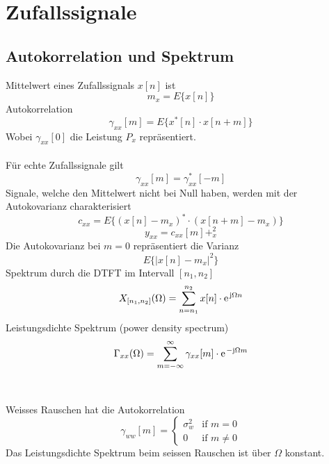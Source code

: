 



\chapter{Zufallssignale}
\section{Autokorrelation und Spektrum}
Mittelwert eines Zufallssignals $x[n]$ ist
\[ m_x = E\{x[n]\} \]
Autokorrelation
\[ \gamma_{xx}[m] = E\{x^*[n] \cdot x[n+m]\} \]
Wobei $\gamma_{xx}[0]$ die Leistung $P_x$ repräsentiert.\\\\
Für echte Zufallssignale gilt
\[ \gamma_{xx}[m] = \gamma_{xx}^*[-m] \]
Signale, welche den Mittelwert nicht bei Null haben, werden mit der Autokovarianz
charakterisiert
\[ c_{xx} = E\{ (x[n]-m_x)^*\cdot(x[n+m]-m_x) \} \]
\[ y_{xx} = c_{xx}[m] + _x^2 \]
Die Autokovarianz bei $m=0$ repräsentiert die Varianz
\[ E\{|x[n]-m_x|^2\} \]
Spektrum durch die DTFT im Intervall $[n_1,n_2]$
\[ X_{[n_1,n_2]}(\Omega) = \sum_{n=n_1}^{n_2}x[n]\cdot\e^{\im\Omega n} \]
Leistungsdichte Spektrum (power density spectrum)
\[ \Gamma_{xx}(\Omega) = \sum_{m=-\infty}^{\infty}\gamma_{xx}[m] \cdot
	\e^{-\im\Omega m} \]
~\\\\
Weisses Rauschen hat die Autokorrelation
\[ \gamma_{ww}[m] = \left\lbrace\begin{matrix}
	\sigma_w^2	& \textrm{if } m = 0\\
	0			& \textrm{if } m \neq 0
\end{matrix}\right. \]
Das Leistungsdichte Spektrum beim seissen Rauschen ist über $\Omega$ konstant.

